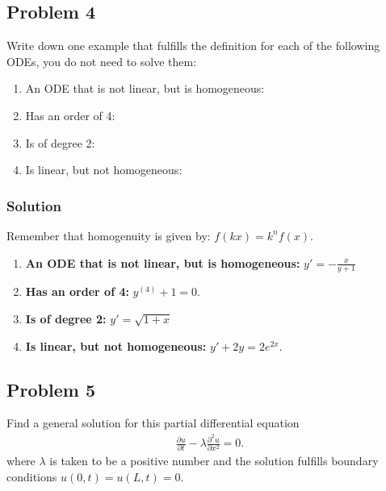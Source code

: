 \subsection*{Problem 4}
Write down one example that fulfills the definition for each of the following ODEs, you do not need to solve them:
\begin{enumerate}
    \item An ODE that is not linear, but is homogeneous:
    \item Has an order of 4:
    \item Is of degree 2:
    \item Is linear, but not homogeneous:
\end{enumerate}

\subsubsection*{Solution}
Remember that homogenuity is given by: $f(kx) = k^nf(x)$.
\begin{enumerate}
    \item \textbf{An ODE that is not linear, but is homogeneous:} $y' = -\frac{x}{y + 1}$
    \item \textbf{Has an order of 4:} $y^{(4)} + 1 = 0$.
    \item \textbf{Is of degree 2:} $y' = \sqrt{1 + x}$
    \item \textbf{Is linear, but not homogeneous:} $y' + 2y = 2e^{2x}$.
\end{enumerate}

\subsection*{Problem 5}
Find a general solution for this partial differential equation
\begin{align*}
    \frac{\partial u}{\partial t} - \lambda \frac{\partial^2u}{\partial x^2} = 0.
\end{align*}where $\lambda$ is taken to be a positive number and the solution fulfills boundary conditions $u(0, t) = u(L, t) = 0$.

